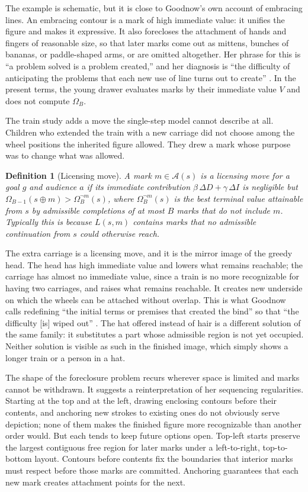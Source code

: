 \documentclass[11pt]{article}
\newtheorem{definition}{Definition}
\theoremstyle{remark}
\newcommand{\A}{\mathcal{A}}
\begin{document}
The example is schematic, but it is close to Goodnow's own account of embracing lines. An embracing contour is a mark of high immediate value: it unifies the figure and makes it expressive. It also forecloses the attachment of hands and fingers of reasonable size, so that later marks come out as mittens, bunches of bananas, or paddle-shaped arms, or are omitted altogether. Her phrase for this is ``a problem solved is a problem created,'' and her diagnosis is ``the difficulty of anticipating the problems that each new use of line turns out to create'' \cite[p.~48]{goodnow1977}. In the present terms, the young drawer evaluates marks by their immediate value $V$ and does not compute $\Omega_B$.

The train study adds a move the single-step model cannot describe at all. Children who extended the train with a new carriage did not choose among the wheel positions the inherited figure allowed. They drew a mark whose purpose was to change what was allowed.

\begin{definition}[Licensing move]
A mark $m \in \A(s)$ is a \emph{licensing move} for a goal $g$ and audience $a$ if its immediate contribution $\beta\,\Delta D + \gamma\,\Delta I$ is negligible but $\Omega_{B-1}(s \oplus m) > \Omega_{B}^{\neg m}(s)$, where $\Omega_{B}^{\neg m}(s)$ is the best terminal value attainable from $s$ by admissible completions of at most $B$ marks that do not include $m$. Typically this is because $L(s,m)$ contains marks that no admissible continuation from $s$ could otherwise reach.
\end{definition}

The extra carriage is a licensing move, and it is the mirror image of the greedy head. The head has high immediate value and lowers what remains reachable; the carriage has almost no immediate value, since a train is no more recognizable for having two carriages, and raises what remains reachable. It creates new underside on which the wheels can be attached without overlap. This is what Goodnow calls redefining ``the initial terms or premises that created the bind'' so that ``the difficulty [is] wiped out'' \cite[p.~56]{goodnow1977}. The hat offered instead of hair is a different solution of the same family: it substitutes a part whose admissible region is not yet occupied. Neither solution is visible as such in the finished image, which simply shows a longer train or a person in a hat.

The shape of the foreclosure problem recurs wherever space is limited and marks cannot be withdrawn. It suggests a reinterpretation of her sequencing regularities. Starting at the top and at the left, drawing enclosing contours before their contents, and anchoring new strokes to existing ones do not obviously serve depiction; none of them makes the finished figure more recognizable than another order would. But each tends to keep future options open. Top-left starts preserve the largest contiguous free region for later marks under a left-to-right, top-to-bottom layout. Contours before contents fix the boundaries that interior marks must respect before those marks are committed. Anchoring guarantees that each new mark creates attachment points for the next.
\end{document}
